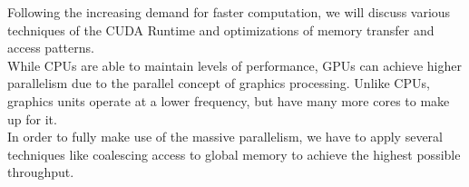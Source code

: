 Following the increasing demand for faster computation, 
we will discuss various techniques of the CUDA Runtime and optimizations of memory transfer and access patterns.\\
While CPUs are able to maintain levels of performance,
GPUs can achieve higher parallelism due to the parallel concept of graphics processing.
Unlike CPUs, graphics units operate at a lower frequency, but have many more cores to make up for it.\\
In order to fully make use of the massive parallelism, we have to apply several techniques like coalescing access to global memory to achieve the highest possible throughput.\\
